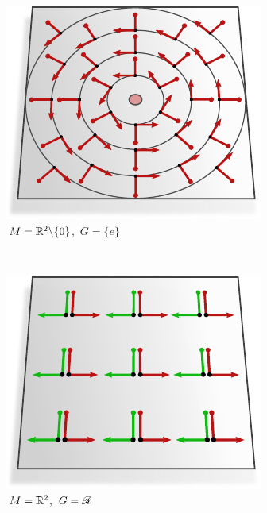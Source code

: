 \hfill
\begin{subfigure}[b]{0.26\textwidth}
	\centering
	\includegraphics[width=1.\textwidth]{figures/G_structure_R2_no_origin_SO2_intro.pdf}
	\captionsetup{format=hang}
	\caption{\small
		\,$M = \mathbb{R}^2\backslash\{0\}$,
		\,$G = \{e\}$
	}
	\label{fig:G_structure_intro_c}
\end{subfigure}
\\[2ex]
%
%
%
%
\begin{subfigure}[b]{0.26\textwidth}
	\centering
	\includegraphics[width=1.\textwidth]{figures/G_structure_R2_3_big.pdf}
	\captionsetup{format=hang}
	\caption{\small
		\,$M = \mathbb{R}^2$,
		\,$G = \mathscr{R}$
	}
	\label{fig:G_structure_intro_d}
\end{subfigure}
